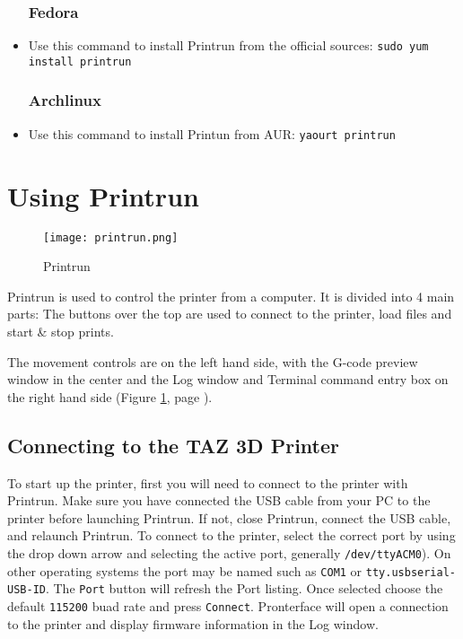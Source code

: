 \begin{itemize}
\subsubsection{Fedora}
\item Use this command to install Printrun from the official sources: \texttt{sudo yum install printrun}

\subsubsection{Archlinux}
\item Use this command to install Printun from AUR: \texttt{yaourt printrun}

\end{itemize}

\section{Using Printrun}

\begin{figure}[H]
\centering
\texttt{[image: printrun.png]}
\caption{Printrun}
\label{fig:printrun}
\end{figure}

Printrun is used to control the printer from a computer. It is divided into 4 main parts: The buttons over the top are used to connect to the printer, load files and start \& stop prints.

The movement controls are on the left hand side, with the G-code preview window in the center and the Log window and Terminal command entry box on the right hand side (Figure \ref{fig:printrun}, page \pageref{fig:printrun}).

\subsection{Connecting to the TAZ 3D Printer}
To start up the printer, first you will need to connect to the printer with Printrun. Make sure you have connected the USB cable from your PC to the printer before launching Printrun. If not, close Printrun, connect the USB cable, and relaunch Printrun. To connect to the printer, select the correct port by using the drop down arrow and selecting the active port, generally \texttt{/dev/ttyACM0}). On other operating systems the port may be named such as \texttt{COM1} or \texttt{tty.usbserial-USB-ID}. The \texttt{Port} button will refresh the Port listing. Once selected choose the default \texttt{115200} buad rate and press \texttt{Connect}. Pronterface will open a connection to the printer and display firmware information in the Log window. 

